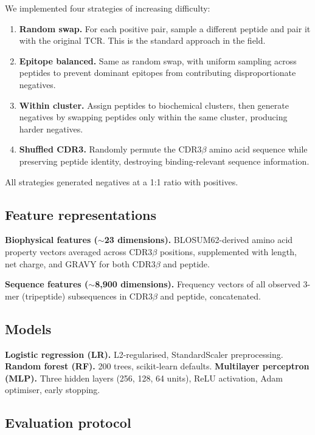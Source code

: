 \documentclass[11pt, a4paper]{article}
\begin{document}
We implemented four strategies of increasing difficulty:

\begin{enumerate}[noitemsep]
    \item \textbf{Random swap.} For each positive pair, sample a different peptide and pair it with the original TCR. This is the standard approach in the field.
    \item \textbf{Epitope balanced.} Same as random swap, with uniform sampling across peptides to prevent dominant epitopes from contributing disproportionate negatives.
    \item \textbf{Within cluster.} Assign peptides to biochemical clusters, then generate negatives by swapping peptides only within the same cluster, producing harder negatives.
    \item \textbf{Shuffled CDR3.} Randomly permute the CDR3$\beta$ amino acid sequence while preserving peptide identity, destroying binding-relevant sequence information.
\end{enumerate}

All strategies generated negatives at a 1:1 ratio with positives.

\subsection{Feature representations}

\textbf{Biophysical features ($\sim$23 dimensions).} BLOSUM62-derived amino acid property vectors averaged across CDR3$\beta$ positions, supplemented with length, net charge, and GRAVY for both CDR3$\beta$ and peptide.

\textbf{Sequence features ($\sim$8,900 dimensions).} Frequency vectors of all observed 3-mer (tripeptide) subsequences in CDR3$\beta$ and peptide, concatenated.

\subsection{Models}

\textbf{Logistic regression (LR).} L2-regularised, StandardScaler preprocessing. \textbf{Random forest (RF).} 200 trees, scikit-learn defaults. \textbf{Multilayer perceptron (MLP).} Three hidden layers (256, 128, 64 units), ReLU activation, Adam optimiser, early stopping.

\subsection{Evaluation protocol}
\end{document}
